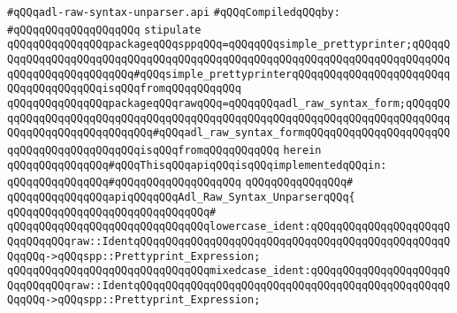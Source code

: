 \label{src/lib/compiler/back/low/tools/adl-syntax/adl-raw-syntax-unparser.api}
\verb|#qQQqadl-raw-syntax-unparser.api|\newline
\newline
\verb|#qQQqCompiledqQQqby:|\newline
\verb|#qQQqqQQqqQQqqQQqqQQq|\newline
\newline
\newline
\verb|stipulate|\newline
\verb|qQQqqQQqqQQqqQQqpackageqQQqsppqQQq=qQQqqQQqsimple_prettyprinter;qQQqqQQqqQQqqQQqqQQqqQQqqQQqqQQqqQQqqQQqqQQqqQQqqQQqqQQqqQQqqQQqqQQqqQQqqQQqqQQqqQQqqQQqqQQqqQQq#qQQqsimple_prettyprinterqQQqqQQqqQQqqQQqqQQqqQQqqQQqqQQqqQQqqQQqisqQQqfromqQQqqQQqqQQq|\newline
\verb|qQQqqQQqqQQqqQQqpackageqQQqrawqQQq=qQQqqQQqadl_raw_syntax_form;qQQqqQQqqQQqqQQqqQQqqQQqqQQqqQQqqQQqqQQqqQQqqQQqqQQqqQQqqQQqqQQqqQQqqQQqqQQqqQQqqQQqqQQqqQQqqQQqqQQq#qQQqadl_raw_syntax_formqQQqqQQqqQQqqQQqqQQqqQQqqQQqqQQqqQQqqQQqqQQqisqQQqfromqQQqqQQqqQQq|\newline
\verb|herein|\newline
\newline
\verb|qQQqqQQqqQQqqQQq#qQQqThisqQQqapiqQQqisqQQqimplementedqQQqin:|\newline
\verb|qQQqqQQqqQQqqQQq#qQQqqQQqqQQqqQQqqQQq|\newline
\verb|qQQqqQQqqQQqqQQq#|\newline
\verb|qQQqqQQqqQQqqQQqapiqQQqqQQqAdl_Raw_Syntax_UnparserqQQq{|\newline
\verb|qQQqqQQqqQQqqQQqqQQqqQQqqQQqqQQq#|\newline
\verb|qQQqqQQqqQQqqQQqqQQqqQQqqQQqqQQqlowercase_ident:qQQqqQQqqQQqqQQqqQQqqQQqqQQqqQQqraw::IdentqQQqqQQqqQQqqQQqqQQqqQQqqQQqqQQqqQQqqQQqqQQqqQQqqQQqqQQq->qQQqspp::Prettyprint_Expression;|\newline
\verb|qQQqqQQqqQQqqQQqqQQqqQQqqQQqqQQqmixedcase_ident:qQQqqQQqqQQqqQQqqQQqqQQqqQQqqQQqraw::IdentqQQqqQQqqQQqqQQqqQQqqQQqqQQqqQQqqQQqqQQqqQQqqQQqqQQqqQQq->qQQqspp::Prettyprint_Expression;|\newline
